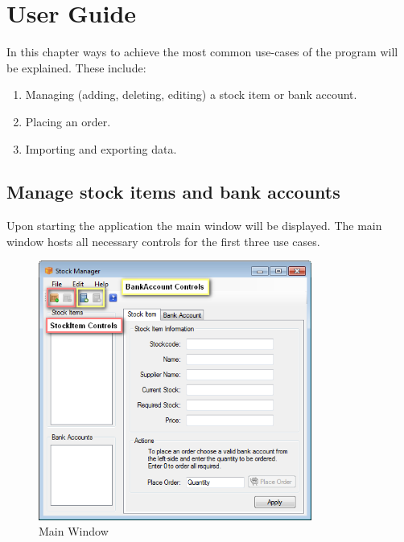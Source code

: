 \chapter{User Guide}\label{ch:user_guide} %

In this chapter ways to achieve the most common use-cases of the program will be explained. These include:

\begin{enumerate}
\item Managing (adding, deleting, editing) a stock item or bank account.
\item Placing an order.
\item Importing and exporting data.
\end{enumerate}

\section{Manage stock items and bank accounts}
\label{sec:manage_stock_item}

Upon starting the application the main window will be displayed.
The main window hosts all necessary controls for the first three use cases.

\begin{figure}[H]
\begin{center}
\includegraphics[width=0.8\textwidth]{gfx/main_window.png}
\caption{Main Window}
\label{fig:main_window}
\end{center}
\end{figure}

